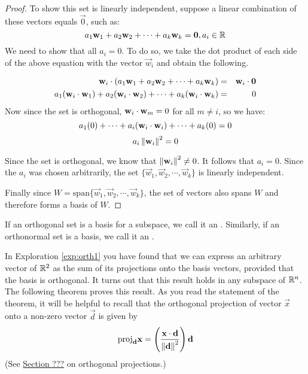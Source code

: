 \documentclass{ximera}
\begin{document}
\begin{proof}
To show this set is linearly independent, suppose a linear combination
of these vectors equals $\vec{0}$, such as:
\[
a_1 \mathbf{w}_1 + a_2 \mathbf{w}_2 + \cdots + a_k \mathbf{w}_k = \mathbf{0}, a_i \in \mathbb{R}
\]
We need to show that all $a_i = 0$. To do so, we take the dot product of
each side of the above equation with the vector $\vec{w}_i$ and obtain the following.

\begin{eqnarray*}
\mathbf{w}_i \cdot (a_1 \mathbf{w}_1 + a_2 \mathbf{w}_2 + \cdots + a_k \mathbf{w}_k ) &=& \mathbf{w}_i \cdot \mathbf{0}\\
a_1 (\mathbf{w}_i \cdot \mathbf{w}_1) + a_2 (\mathbf{w}_i \cdot \mathbf{w}_2) + \cdots + a_k (\mathbf{w}_i \cdot \mathbf{w}_k)  &=& 0
\end{eqnarray*}
Now since the set is orthogonal, $\mathbf{w}_i \cdot \mathbf{w}_m = 0$ for all $m \neq i$, so we have:
\[
a_1 (0) + \cdots + a_i(\mathbf{w}_i \cdot \mathbf{w}_i) + \cdots + a_k (0) = 0
\]
\[
a_i \left\lVert\mathbf{w}_i\right\rVert^2 = 0
\]

Since the set is orthogonal, we know that $\left\lVert\mathbf{w}_i\right\rVert^2  \neq 0$. It follows that $a_i =0$. Since the $a_i$ was chosen arbitrarily, the set $\{ \vec{w}_1, \vec{w}_2, \cdots, \vec{w}_k \}$ is linearly independent.

Finally since $W = \mbox{span} \{ \vec{w}_1, \vec{w}_2, \cdots,
\vec{w}_k \}$, the set of vectors also spans $W$ and therefore forms a basis of $W$.

\end{proof}

If an orthogonal set is a basis for a subspace, we call it an
. Similarly, if an orthonormal set is a basis, we call it an .

In Exploration \ref{exp:orth1} you have found that we can express an arbitrary vector of $\mathbb{R}^2$ as the sum of its projections onto the basis vectors, provided that the basis is orthogonal. It turns out that this result holds in any subspace of $\mathbb{R}^n$. The following theorem proves this result.  As you read the statement of the theorem, it will be helpful to recall that the orthogonal projection of vector $\vec{x}$ onto a non-zero vector $\vec{d}$ is given by
$$\mbox{proj}_{\mathbf{d}}\mathbf{x}=\left(\frac{\mathbf{x}\cdot\mathbf{d}}{\left\lVert\mathbf{d}\right\rVert^2}\right)\mathbf{d}$$ (See \href{https://ximera.osu.edu/oerlinalg/LinearAlgebra/VEC-0070/main}{Section ???} on orthogonal projections.)
\end{document}

